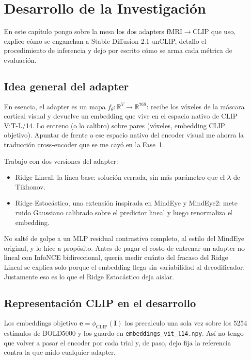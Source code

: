 \chapter{Desarrollo de la Investigación}

En este capítulo pongo sobre la mesa los dos adapters fMRI$\rightarrow$CLIP que uso, explico cómo se enganchan a Stable Diffusion 2.1 unCLIP, detallo el procedimiento de inferencia y dejo por escrito cómo se arma cada métrica de evaluación.

\section{Idea general del adapter}

En esencia, el adapter es un mapa $f_{\theta}:\mathbb{R}^{V}\rightarrow\mathbb{R}^{768}$: recibe los vóxeles de la máscara cortical visual y devuelve un embedding que vive en el espacio nativo de CLIP ViT-L/14. Lo entreno (o lo calibro) sobre pares (vóxeles, embedding CLIP objetivo). Apuntar de frente a ese espacio nativo del encoder visual me ahorra la traducción cross-encoder que se me cayó en la Fase~1.

Trabajo con dos versiones del adapter:
\begin{itemize}
\item[•] Ridge Lineal, la línea base: solución cerrada, sin más parámetro que el $\lambda$ de Tikhonov.
\item[•] Ridge Estocástico, una extensión inspirada en MindEye y MindEye2: mete ruido Gaussiano calibrado sobre el predictor lineal y luego renormaliza el embedding.
\end{itemize}

No salté de golpe a un MLP residual contrastivo completo, al estilo del MindEye original, y lo hice a propósito. Antes de pagar el costo de entrenar un adapter no lineal con InfoNCE bidireccional, quería medir cuánto del fracaso del Ridge Lineal se explica solo porque el embedding llega sin variabilidad al decodificador. Justamente eso es lo que el Ridge Estocástico deja aislar.

\section{Representación CLIP en el desarrollo}

Los embeddings objetivo $\mathbf{e}=\phi_{\mathrm{CLIP}}(\mathbf{I})$ los precalculo una sola vez sobre los 5254 estímulos de BOLD5000 y los guardo en \texttt{embeddings\_vit\_l14.npy}. Así no tengo que volver a pasar el encoder por cada trial y, de paso, dejo fija la referencia contra la que mido cualquier adapter.


